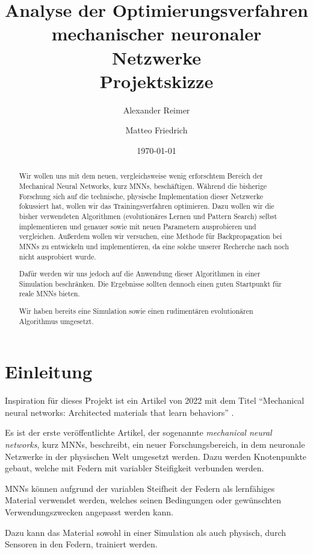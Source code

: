\documentclass[parskip]{scrartcl}
\title{
    Analyse der Optimierungsverfahren mechanischer neuronaler Netzwerke \\ 
    \LARGE \normalfont Projektskizze
}
\author{Alexander Reimer \and Matteo Friedrich}
\date{\today}
\newcommand*{\eng}[1]{\textit{#1}}
\newcommand*{\feng}[1]{\eng{#1}}
\begin{document}
\maketitle

\tableofcontents

\begin{abstract}
    Wir wollen uns mit dem neuen, vergleichsweise wenig erforschtem Bereich der Mechanical Neural Networks, kurz MNNs, beschäftigen.
    Während die bisherige Forschung sich auf die technische, physische Implementation dieser Netzwerke fokussiert hat, wollen wir das Trainingsverfahren optimieren.
    Dazu wollen wir die bisher verwendeten Algorithmen (evolutionäres Lernen und Pattern Search) selbst implementieren und genauer sowie mit neuen Parametern ausprobieren und vergleichen.
    Außerdem wollen wir versuchen, eine Methode für Backpropagation bei MNNs zu entwickeln und implementieren, da eine solche unserer Recherche nach noch nicht ausprobiert wurde.
    
    Dafür werden wir uns jedoch auf die Anwendung dieser Algorithmen in einer Simulation beschränken. Die Ergebnisse sollten dennoch einen guten Startpunkt für reale MNNs bieten.
    
    Wir haben bereits eine Simulation sowie einen rudimentären evolutionären Algorithmus umgesetzt.
\end{abstract}

\section{Einleitung}

Inspiration für dieses Projekt ist ein Artikel von 2022 mit dem Titel \enquote{Mechanical neural networks: Architected materials that learn behaviors} \cite{Lee2022}.

Es ist der erste veröffentlichte Artikel, der sogenannte \feng{mechanical neural networks}, kurz MNNs, beschreibt, ein neuer Forschungsbereich, in dem neuronale Netzwerke in der physischen Welt umgesetzt werden.
Dazu werden Knotenpunkte gebaut, welche mit Federn mit variabler Steifigkeit verbunden werden.

MNNs können aufgrund der variablen Steifheit der Federn als lernfähiges Material verwendet werden, welches seinen Bedingungen oder gewünschten Verwendungszwecken angepasst werden kann.

Dazu kann das Material sowohl in einer Simulation als auch physisch, durch Sensoren in den Federn, trainiert werden.
\end{document}
